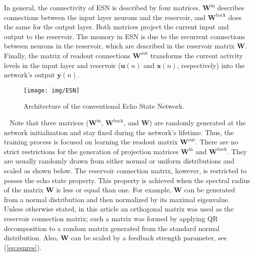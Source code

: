 In general, the connectivity of ESN is described by four matrices. $\textbf{W}^{\text{in}}$ describes connections between the input layer neurons and the reservoir, and $\textbf{W}^{\text{back}}$ does the same for the output layer. Both matrices project the current input and output to the reservoir.   
The memory in ESN is due to the recurrent connections between neurons in the reservoir, which are described in the reservoir matrix $\textbf{W}$.  
Finally, the matrix of readout connections $\textbf{W}^{\text{out}}$ transforms the current activity levels in the input layer and reservoir ($\textbf{u}(n)$ and $\textbf{x}(n)$, respectively) into the network's output $\textbf{y}(n)$.  
~
\begin{figure}[tb]%
\centering
\texttt{[image: img/ESN]}
\caption{Architecture of the conventional Echo State Network.}
\label{fig:esn}
\end{figure}
~
Note that three matrices ($\textbf{W}^{\text{in}}$, $\textbf{W}^{\text{back}}$, and $\textbf{W}$) are randomly generated at the network initialization and stay fixed during the network's lifetime. Thus, the training process is focused on learning the readout matrix $\textbf{W}^{\text{out}}$. There are no strict restrictions for the generation of projection matrices   
$\textbf{W}^{\text{in}}$ and $\textbf{W}^{\text{back}}$. They are usually randomly drawn from either normal or uniform distributions and scaled as shown below. The reservoir connection matrix, however, is restricted to posses the echo state property. This property is achieved when the  spectral radius of the matrix  $\textbf{W}$ is less or equal than one. 
For example, $\textbf{W}$ can be generated from a normal distribution and then normalized by its maximal eigenvalue.
Unless otherwise stated, in this article an orthogonal matrix was used as the reservoir connection matrix; such a matrix was formed by applying QR decomposition to a random matrix generated from the standard normal distribution. Also, $\textbf{W}$ can be scaled by a feedback strength parameter, see (\ref{eq:esnres}).

